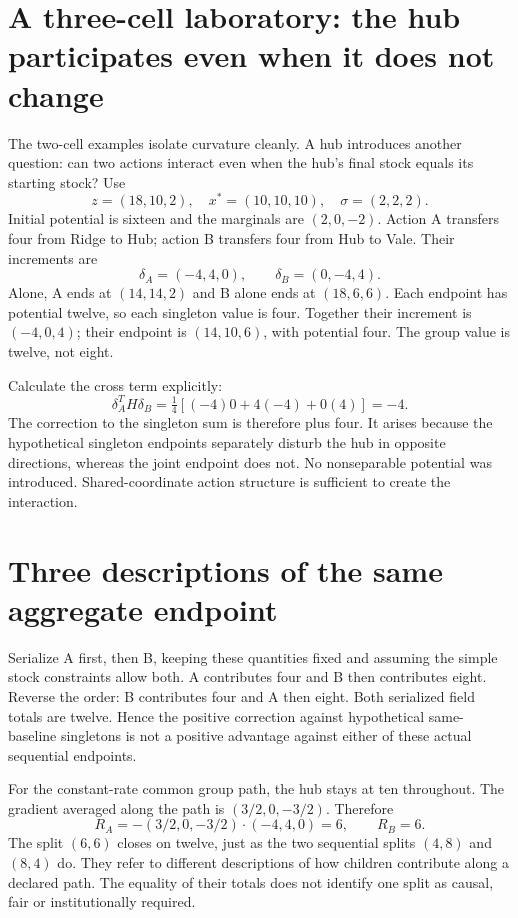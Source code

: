 \section{A three-cell laboratory: the hub participates even when it does not change}
The two-cell examples isolate curvature cleanly. A hub introduces another
question: can two actions interact even when the hub's final stock equals
its starting stock? Use
\begin{equation}
 z=(18,10,2),\quad x^*=(10,10,10),\quad\sigma=(2,2,2).
\end{equation}
Initial potential is sixteen and the marginals are $(2,0,-2)$.
Action A transfers four from Ridge to Hub; action B transfers four from
Hub to Vale. Their increments are
\begin{equation}
 \delta_A=(-4,4,0),\qquad\delta_B=(0,-4,4).
\end{equation}
Alone, A ends at $(14,14,2)$ and B alone ends at $(18,6,6)$.
Each endpoint has potential twelve, so each singleton value is four.
Together their increment is $(-4,0,4)$; their endpoint is $(14,10,6)$,
with potential four. The group value is twelve, not eight.

Calculate the cross term explicitly:
\begin{equation}
 \delta_A^TH\delta_B
 =\tfrac14[(-4)0+4(-4)+0(4)]=-4.
\end{equation}
The correction to the singleton sum is therefore plus four. It arises
because the hypothetical singleton endpoints separately disturb the hub
in opposite directions, whereas the joint endpoint does not. No
nonseparable potential was introduced. Shared-coordinate action structure
is sufficient to create the interaction.

\section{Three descriptions of the same aggregate endpoint}
Serialize A first, then B, keeping these quantities fixed and assuming
the simple stock constraints allow both. A contributes four and B then
contributes eight. Reverse the order: B contributes four and A then eight.
Both serialized field totals are twelve. Hence the positive correction
against hypothetical same-baseline singletons is not a positive advantage
against either of these actual sequential endpoints.

For the constant-rate common group path, the hub stays at ten throughout.
The gradient averaged along the path is $(3/2,0,-3/2)$. Therefore
\begin{equation}
 R_A=-(3/2,0,-3/2)\cdot(-4,4,0)=6,
 \qquad R_B=6.
\end{equation}
The split $(6,6)$ closes on twelve, just as the two sequential splits
$(4,8)$ and $(8,4)$ do. They refer to different descriptions of how
children contribute along a declared path. The equality of their totals
does not identify one split as causal, fair or institutionally required.


